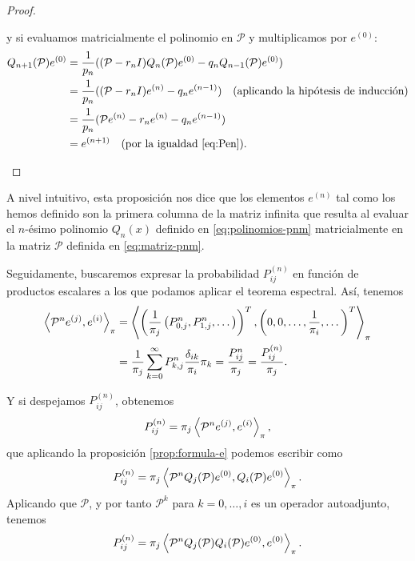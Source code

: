 \begin{proof}
\begin{itemize}
            y si evaluamos matricialmente el polinomio en $\mathcal{P}$ y multiplicamos por $e^{(0)}$:
            \begin{equation*}
                \begin{split}
                    Q_{n+1}(\mathcal{P})e^{(0)} &= \dfrac{1}{p_n}((\mathcal{P}-r_n I)Q_n(\mathcal{P})e^{(0)}-q_n Q_{n-1}(\mathcal{P})e^{(0)}) \\
                    &= \dfrac{1}{p_n}((\mathcal{P}-r_n I)e^{(n)}-q_n e^{(n-1)}) \ \  \ \text{(aplicando la hipótesis de inducción)} \\
                    &= \dfrac{1}{p_n}(\mathcal{P}e^{(n)} -r_n e^{(n)}-q_n e^{(n-1)}) \\
                    &= e^{(n+1)} \ \ \ \text{(por la igualdad \eqref{eq:Pen})}.
                \end{split}
            \end{equation*}
        \end{itemize}
    \end{proof}

    A nivel intuitivo, esta proposición nos dice que los elementos $e^{(n)}$ tal como los hemos definido son la primera columna de la matriz infinita que resulta al evaluar el $n$-ésimo polinomio $Q_n(x)$ definido en \eqref{eq:polinomios-pnm} matricialmente en la matriz $\mathcal{P}$ definida en \eqref{eq:matriz-pnm}.

    Seguidamente, buscaremos expresar la probabilidad $P_{ij}^{(n)}$ en función de productos escalares a los que podamos aplicar el teorema espectral. Así, tenemos
    \begin{equation*}
        \begin{split}
            \left\langle \mathcal{P}^n e^{(j)} , e^{(i)} \right\rangle_\pi &= \left\langle \left(\dfrac{1}{\pi_j}\left(P^n_{0,j},P^n_{1,j},\dots\right)\right)^T , \left(0,0,\dots, \dfrac{1}{\pi_i},\dots \right)^T \right\rangle_\pi \\
            &= \dfrac{1}{\pi_j} \sum_{k=0}^\infty P^n_{k,j} \dfrac{\delta_{ik}}{\pi_i}\pi_k = \dfrac{P^n_{ij}}{\pi_j}=\dfrac{P^{(n)}_{ij}}{\pi_j}.
        \end{split}
    \end{equation*}

    Y si despejamos $P^{(n)}_{ij}$, obtenemos
    \begin{equation*}
        P^{(n)}_{ij} = \pi_j \left\langle \mathcal{P}^n e^{(j)} , e^{(i)} \right\rangle_\pi,
    \end{equation*}
    que aplicando la proposición \ref{prop:formula-e} podemos escribir como
    \begin{equation*}
        P^{(n)}_{ij} = \pi_j \left\langle \mathcal{P}^n Q_j(\mathcal{P})e^{(0)} , Q_{i}(\mathcal{P})e^{(0)} \right\rangle_\pi.
    \end{equation*}
    Aplicando que $\mathcal{P}$, y por tanto $\mathcal{P}^k$ para $k=0,\dots,i$ es un operador autoadjunto, tenemos
    \begin{equation*}
        P^{(n)}_{ij} = \pi_j \left\langle \mathcal{P}^n Q_j(\mathcal{P})Q_{i}(\mathcal{P})e^{(0)} , e^{(0)} \right\rangle_\pi.
    \end{equation*}

